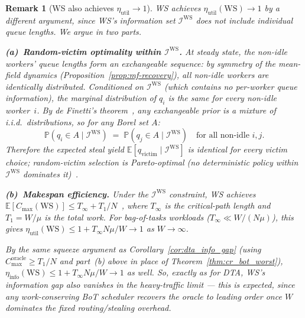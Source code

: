 \documentclass[11pt,a4paper]{article}
\newtheorem{remark}{Remark}[section]
\begin{document}
\begin{remark}[WS also achieves $\eta_{\mathrm{util}}\to 1$]
\label{rem:ws_opt}
WS achieves $\eta_{\mathrm{util}}(\mathrm{WS})\to 1$ by a
\emph{different} argument, since WS's information set
$\mathcal{I}^{\mathrm{WS}}$ does not include individual queue lengths.
We argue in two parts.

\noindent\textbf{(a)~Random-victim optimality within $\mathcal{I}^{\mathrm{WS}}$.}
At steady state, the non-idle workers' queue lengths form an
\emph{exchangeable} sequence: by symmetry of the mean-field dynamics
(Proposition~\ref{prop:mf-recovery}), all non-idle workers are
identically distributed.  Conditioned on $\mathcal{I}^{\mathrm{WS}}$
(which contains no per-worker queue information), the marginal
distribution of $q_i$ is the same for every non-idle worker~$i$.
By de Finetti's theorem~\cite{norris1997}, any exchangeable prior
is a mixture of i.i.d.\ distributions, so for any Borel set $A$:
\[
  \mathbb{P}(q_i \in A \mid \mathcal{I}^{\mathrm{WS}})
  \;=\;
  \mathbb{P}(q_j \in A \mid \mathcal{I}^{\mathrm{WS}})
  \quad\text{for all non-idle }i,j.
\]
Therefore the expected steal yield $\mathbb{E}[q_{\mathrm{victim}} \mid
\mathcal{I}^{\mathrm{WS}}]$ is \emph{identical} for every victim choice;
random-victim selection is Pareto-optimal (no deterministic policy
within $\mathcal{I}^{\mathrm{WS}}$ dominates it)~\cite{blumofe1999}.

\noindent\textbf{(b)~Makespan efficiency.}
Under the $\mathcal{I}^{\mathrm{WS}}$ constraint, WS achieves
$\mathbb{E}[C_{\max}(\mathrm{WS})] \leq T_\infty + T_1/N$~\cite{blumofe1999},
where $T_\infty$ is the critical-path length and $T_1 = W/\mu$ is the
total work.  For bag-of-tasks workloads ($T_\infty \ll W/(N\mu)$),
this gives $\eta_{\mathrm{util}}(\mathrm{WS}) \leq 1 + T_\infty N\mu/W
\to 1$ as $W \to \infty$.

By the same squeeze argument as Corollary~\ref{cor:dta_info_gap}
(using $C_{\max}^{\mathrm{oracle}} \geq T_1/N$ and part~(b) above in place
of Theorem~\ref{thm:cr_bot_worst}), $\eta_{\mathrm{info}}(\mathrm{WS})
\leq 1 + T_\infty N\mu/W \to 1$ as well. So, exactly as for DTA, WS's
information gap also vanishes in the heavy-traffic limit --- this is
expected, since \emph{any} work-conserving BoT scheduler recovers the
oracle to leading order once $W$ dominates the fixed routing/stealing
overhead.


\end{remark}
\end{document}
